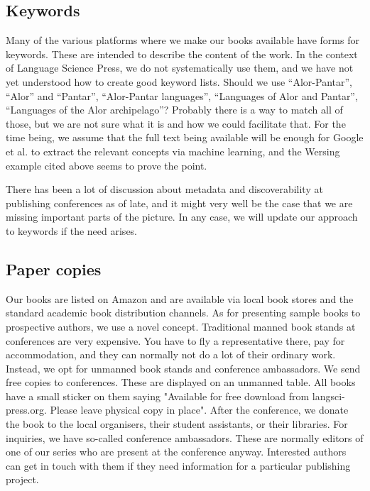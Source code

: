 \documentclass[nonflat,modfonts,output=book] {langsci/langscibook}
\begin{document}
\subsection{Keywords }
Many of the various platforms where we make our books available have forms for keywords. These are intended to describe the content of the work. In the context of Language Science Press, we do not systematically use them, and we have not yet understood how to create good keyword lists. Should we use ``Alor-Pantar'', ``Alor'' and ``Pantar'', ``Alor-Pantar languages'', ``Languages of Alor and Pantar'', ``Languages of the Alor archipelago''? Probably there is a way to match all of those, but we are not sure what it is and how we could facilitate that. For the time being, we assume that the full text being available will be enough for Google et al. to extract the relevant concepts via machine learning, and the Wersing example cited above seems to prove the point. 

There has been a lot of discussion about metadata and discoverability at publishing conferences as of late, and it might very well be the case that we are missing important parts of the picture. In any case, we will update our approach to keywords if the need arises.
                    
\subsection{Paper copies}                    
Our books are listed on Amazon and are available via local book stores and the standard academic book distribution channels. As for presenting sample books to prospective authors, we use a novel concept. Traditional manned book stands at conferences are very expensive. You have to fly a representative there, pay for accommodation, and they can normally not do a lot of their ordinary work. Instead, we opt for unmanned book stands and conference ambassadors. We send free copies to conferences.  These are displayed on an unmanned table. All books have a small sticker on them saying "Available for free download from langsci-press.org. Please leave physical copy in place". After the conference, we donate the book to the local organisers, their student assistants, or their libraries. 
For inquiries, we have so-called conference ambassadors. These are normally editors of one of our series who are present at the conference anyway. Interested authors can get in touch with them if they need information for a particular publishing project. 
                    
\end{document}

